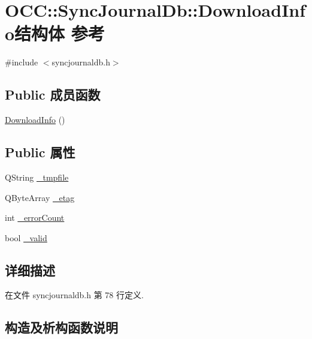 \hypertarget{struct_o_c_c_1_1_sync_journal_db_1_1_download_info}{}\section{O\+CC\+:\+:Sync\+Journal\+Db\+:\+:Download\+Info结构体 参考}
\label{struct_o_c_c_1_1_sync_journal_db_1_1_download_info}


{\ttfamily \#include $<$syncjournaldb.\+h$>$}

\subsection*{Public 成员函数}
\begin{DoxyCompactItemize}
\item 
\hyperlink{struct_o_c_c_1_1_sync_journal_db_1_1_download_info_a9ba83ca0352b0667adee1797ce5d66c4}{Download\+Info} ()
\end{DoxyCompactItemize}
\subsection*{Public 属性}
\begin{DoxyCompactItemize}
\item 
Q\+String \hyperlink{struct_o_c_c_1_1_sync_journal_db_1_1_download_info_a1ccbad92fe706da11a2a2ad2d85a1cba}{\+\_\+tmpfile}
\item 
Q\+Byte\+Array \hyperlink{struct_o_c_c_1_1_sync_journal_db_1_1_download_info_ac37b128c795d80d9ba3645261998d928}{\+\_\+etag}
\item 
int \hyperlink{struct_o_c_c_1_1_sync_journal_db_1_1_download_info_a9b3afb22fea82dbe6b18b83995149d50}{\+\_\+error\+Count}
\item 
bool \hyperlink{struct_o_c_c_1_1_sync_journal_db_1_1_download_info_a7efdea90a57be478dbf70585b618d4d9}{\+\_\+valid}
\end{DoxyCompactItemize}


\subsection{详细描述}


在文件 syncjournaldb.\+h 第 78 行定义.



\subsection{构造及析构函数说明}
\mbox{\label{struct_o_c_c_1_1_sync_journal_db_1_1_download_info_a9ba83ca0352b0667adee1797ce5d66c4}} 
